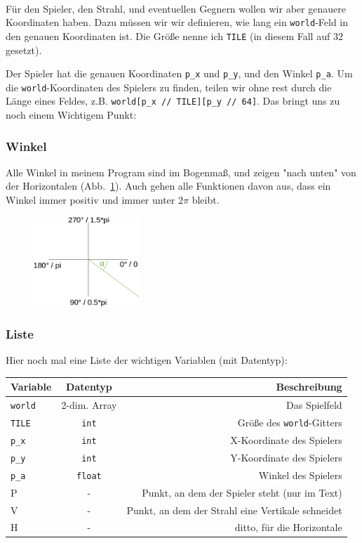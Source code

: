 \documentclass[a4paper,12pt]{report}
\begin{document}
\paragraph*{}
Für den Spieler, den Strahl, und eventuellen Gegnern wollen wir aber genauere Koordinaten haben. Dazu müssen wir wir definieren, wie lang ein \texttt{world}-Feld in den genauen Koordinaten ist. Die Größe nenne ich \texttt{TILE} (in diesem Fall auf 32 gesetzt).

Der Spieler hat die genauen Koordinaten \texttt{p\_x} und \texttt{p\_y}, und den Winkel \texttt{p\_a}. Um die \texttt{world}-Koordinaten des Spielers zu finden, teilen wir ohne rest durch die Länge eines Feldes, z.B. \texttt{world[p\_x // TILE][p\_y // 64]}. Das bringt uns zu noch einem Wichtigem Punkt:

\subsubsection{Winkel}
Alle Winkel in meinem Program sind im Bogenmaß, und zeigen "nach unten" von der Horizontalen (Abb.~\ref{fig:angles}). Auch gehen alle Funktionen davon aus, dass ein Winkel immer positiv und immer unter $2\pi$ bleibt.
\begin{figure}[htbp] 
        \centering
        \includegraphics[width=4cm]{angles.png} 
        \label{fig:angles}
\end{figure}

\subsubsection{Liste}
Hier noch mal eine Liste der wichtigen Variablen (mit Datentyp):
\begin{center}
	\begin{tabular}{|l|c|r|}
		\hline
		Variable & Datentyp & Beschreibung \\ \hline
		\hline
		\texttt{world} & 2-dim. Array & Das Spielfeld \\ \hline
		\texttt{TILE} & \texttt{int} & Größe des \texttt{world}-Gitters \\ \hline
		\texttt{p\_x} & \texttt{int} & X-Koordinate des Spielers \\ \hline
		\texttt{p\_y} & \texttt{int} & Y-Koordinate des Spielers \\ \hline
		\texttt{p\_a} & \texttt{float} & Winkel des Spielers \\ \hline
		P & - & Punkt, an dem der Spieler steht (nur im Text) \\ \hline
		V & - & Punkt, an dem der Strahl eine Vertikale schneidet \\ \hline
		H & - & ditto, für die Horizontale \\ \hline
	\end{tabular}
\end{center}
\end{document}
